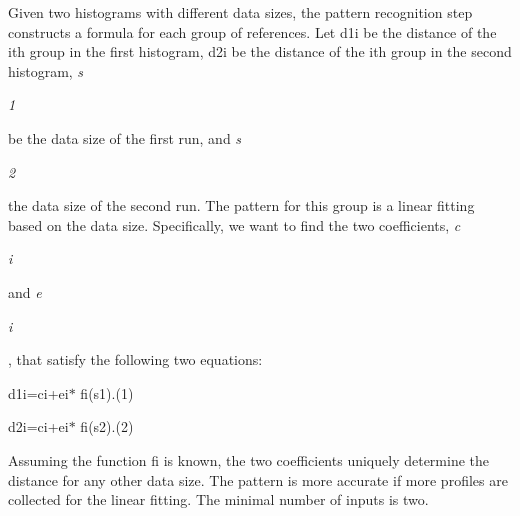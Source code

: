 \documentclass[12pt]{article}
\begin{document}
\vspace{\baselineskip}
\begin{adjustwidth}{0.0in}{0.12in}
{\fontsize{10pt}{12.0pt}\selectfont \textcolor[HTML]{333333}{Given two histograms with different data sizes, the pattern recognition step constructs a formula for each group of references. Let d1i be the distance of the ith group in the first histogram, d2i be the distance of the ith group in the second histogram, \textit{s}}{\fontsize{7pt}{8.4pt}\selectfont \textit{\textcolor[HTML]{333333}{1}}{\fontsize{10pt}{12.0pt}\selectfont \textcolor[HTML]{333333}{ be the data size of the first run, and \textit{s}}{\fontsize{7pt}{8.4pt}\selectfont \textit{\textcolor[HTML]{333333}{2}}{\fontsize{10pt}{12.0pt}\selectfont \textcolor[HTML]{333333}{ the data size of the second run. The pattern for this group is a linear fitting based on the data size. Specifically, we want to find the two coefficients, \textit{c}}{\fontsize{7pt}{8.4pt}\selectfont \textit{\textcolor[HTML]{333333}{i}}{\fontsize{10pt}{12.0pt}\selectfont \textcolor[HTML]{333333}{ and \textit{e}}{\fontsize{7pt}{8.4pt}\selectfont \textit{\textcolor[HTML]{333333}{i}}{\fontsize{10pt}{12.0pt}\selectfont \textcolor[HTML]{333333}{, that satisfy the following two equations:}\par}\par}\par}\par}\par}\par}\par}\par}\par}\par

\end{adjustwidth}


\vspace{\baselineskip}
{\fontsize{11pt}{13.2pt}\selectfont \textcolor[HTML]{333333}{d1i=ci+ei$\ast$ fi(s1).(1)}\par}\par


\vspace{\baselineskip}
{\fontsize{11pt}{13.2pt}\selectfont \textcolor[HTML]{333333}{d2i=ci+ei$\ast$ fi(s2).(2)}\par}\par


\vspace{\baselineskip}

\vspace{\baselineskip}
\begin{adjustwidth}{0.0in}{0.01in}
{\fontsize{11pt}{13.2pt}\selectfont \textcolor[HTML]{333333}{Assuming the function fi is known, the two coefficients uniquely determine the distance for any other data size. The pattern is more accurate if more profiles are collected for the linear fitting. The minimal number of inputs is two.}\par}\par

\end{adjustwidth}
\end{document}
